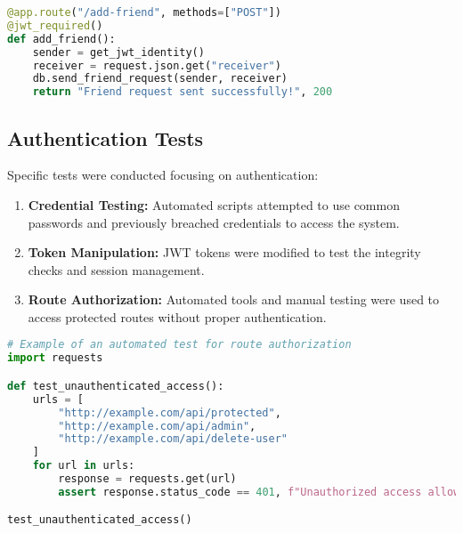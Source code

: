 \documentclass{article}
\begin{document}
\begin{lstlisting}[language=Python]
@app.route("/add-friend", methods=["POST"])
@jwt_required()
def add_friend():
    sender = get_jwt_identity()
    receiver = request.json.get("receiver")
    db.send_friend_request(sender, receiver)
    return "Friend request sent successfully!", 200
\end{lstlisting}

\subsection*{Authentication Tests}
Specific tests were conducted focusing on authentication:

\begin{enumerate}
    \item \textbf{Credential Testing:} Automated scripts attempted to use common passwords and previously breached credentials to access the system.
    \item \textbf{Token Manipulation:} JWT tokens were modified to test the integrity checks and session management.
    \item \textbf{Route Authorization:} Automated tools and manual testing were used to access protected routes without proper authentication.
\end{enumerate}

\begin{lstlisting}[language=Python]
# Example of an automated test for route authorization
import requests

def test_unauthenticated_access():
    urls = [
        "http://example.com/api/protected",
        "http://example.com/api/admin",
        "http://example.com/api/delete-user"
    ]
    for url in urls:
        response = requests.get(url)
        assert response.status_code == 401, f"Unauthorized access allowed for {url}"

test_unauthenticated_access()
\end{lstlisting}
\end{document}
